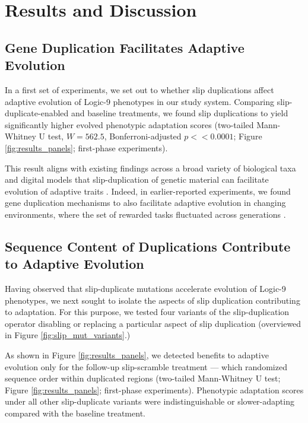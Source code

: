 \section{Results and Discussion} \label{sec:results}

\subsection{Gene Duplication Facilitates Adaptive Evolution}

In a first set of experiments, we set out to whether slip duplications affect adaptive evolution of Logic-9 phenotypes in our study system.
Comparing slip-duplicate-enabled and baseline treatments, we found slip duplications to yield significantly higher evolved phenotypic adaptation scores (two-tailed Mann-Whitney U test, $W = 562.5$, Bonferroni-adjusted $p << 0.0001$; Figure \ref{fig:results_panels}; first-phase experiments).

This result aligns with existing findings across a broad variety of biological taxa and digital models that slip-duplication of genetic material can facilitate evolution of adaptive traits \citep{Koza:1995fr,Zhang:2003fw,Teichmann:2004cz}.
Indeed, in earlier-reported experiments, we found gene duplication mechanisms to also facilitate adaptive evolution in changing environments, where the set of rewarded tasks fluctuated across generations \citep{lalejini2017gene}.



\subsection{Sequence Content of Duplications Contribute to Adaptive Evolution}

Having observed that slip-duplicate mutations accelerate evolution of Logic-9 phenotypes, we next sought to isolate the aspects of slip duplication contributing to adaptation.
For this purpose, we tested four variants of the slip-duplication operator disabling or replacing a particular aspect of slip duplication (overviewed in Figure \ref{fig:slip_mut_variants}.)

As shown in Figure \ref{fig:results_panels}, we detected benefits to adaptive evolution only for the follow-up slip-scramble treatment --- which randomized sequence order within duplicated regions (two-tailed Mann-Whitney U test; Figure \ref{fig:results_panels}; first-phase experiments).
Phenotypic adaptation scores under all other slip-duplicate variants were indistinguishable or slower-adapting compared with the baseline treatment.

